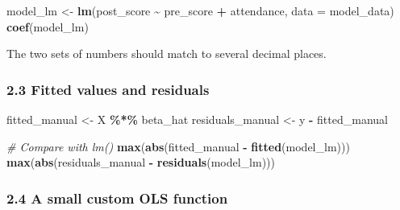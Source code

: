 \documentclass[11pt]{article}
\newenvironment{Shaded}{\begin{snugshade}}{\end{snugshade}}
\newcommand{\AttributeTok}[1]{\textcolor[rgb]{0.13,0.29,0.53}{#1}}
\newcommand{\CommentTok}[1]{\textcolor[rgb]{0.56,0.35,0.01}{\textit{#1}}}
\newcommand{\FunctionTok}[1]{\textcolor[rgb]{0.13,0.29,0.53}{\textbf{#1}}}
\newcommand{\NormalTok}[1]{#1}
\newcommand{\OtherTok}[1]{\textcolor[rgb]{0.56,0.35,0.01}{#1}}
\newcommand{\SpecialCharTok}[1]{\textcolor[rgb]{0.81,0.36,0.00}{\textbf{#1}}}
\begin{document}
\begin{Shaded}
\begin{Highlighting}[]
\NormalTok{model\_lm }\OtherTok{\textless{}{-}} \FunctionTok{lm}\NormalTok{(post\_score }\SpecialCharTok{\textasciitilde{}}\NormalTok{ pre\_score }\SpecialCharTok{+}\NormalTok{ attendance, }\AttributeTok{data =}\NormalTok{ model\_data)}
\FunctionTok{coef}\NormalTok{(model\_lm)}
\end{Highlighting}
\end{Shaded}

The two sets of numbers should match to several decimal places.

\hypertarget{fitted-values-and-residuals}{%
\subsubsection{2.3 Fitted values and
residuals}\label{fitted-values-and-residuals}}

\begin{Shaded}
\begin{Highlighting}[]
\NormalTok{fitted\_manual }\OtherTok{\textless{}{-}}\NormalTok{ X }\SpecialCharTok{\%*\%}\NormalTok{ beta\_hat}
\NormalTok{residuals\_manual }\OtherTok{\textless{}{-}}\NormalTok{ y }\SpecialCharTok{{-}}\NormalTok{ fitted\_manual}

\CommentTok{\# Compare with lm()}
\FunctionTok{max}\NormalTok{(}\FunctionTok{abs}\NormalTok{(fitted\_manual }\SpecialCharTok{{-}} \FunctionTok{fitted}\NormalTok{(model\_lm)))}
\FunctionTok{max}\NormalTok{(}\FunctionTok{abs}\NormalTok{(residuals\_manual }\SpecialCharTok{{-}} \FunctionTok{residuals}\NormalTok{(model\_lm)))}
\end{Highlighting}
\end{Shaded}

\hypertarget{a-small-custom-ols-function}{%
\subsubsection{2.4 A small custom OLS
function}\label{a-small-custom-ols-function}}
\end{document}
